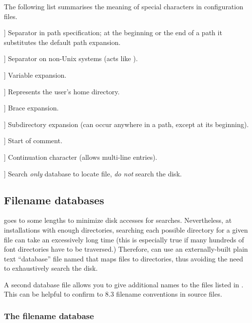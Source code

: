 \documentclass{article}
\begin{document}
The following list summarises the meaning of special characters
in \KPS{} configuration files.

\newcommand{\CODE}[1]{\makebox[2.5em][l]{\code{#1}}}
\begin{ttdescription}
\item[\CODE{:}] Separator in path specification; at the beginning or
  the end of a path it substitutes the default path expansion.
\item[\CODE{;}] Separator on non-Unix systems (acts like \code{:}).
\item[\CODE{\$}] Variable expansion.
\item[\CODE{\string~}] Represents the user's home directory. 
\item[\CODE{\char`\{\dots\char`\}}] Brace expansion.
\item[\CODE{//}] Subdirectory expansion (can occur anywhere in
    a path, except at its beginning).
\item[\CODE{\%}] Start of comment.
\item[\CODE{\bs}] Continuation character (allows multi-line entries).
\item[\CODE{!!}] Search \emph{only} database to locate file, \emph{do
    not} search the disk.
\end{ttdescription}


\subsection{Filename databases}
\label{Filename-database}

\KPS{} goes to some lengths to minimize disk accesses for searches.
Nevertheless, at installations with enough directories, searching each
possible directory for a given file can take an excessively long time
(this is especially true if many hundreds of font directories have to
be traversed.)  Therefore, \KPS{} can use an externally-built plain text
``database'' file named  that maps files to directories,
thus avoiding the need to exhaustively search the disk.

A second database file  allows you to give additional
names to the files listed in .  This can be helpful to
confirm to  8.3 filename conventions in source files.

\subsubsection{The filename database}
\label{ls-R}
\end{document}
